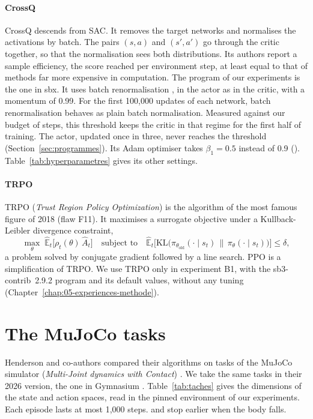 \paragraph{CrossQ}
CrossQ \parencite{bhatt2024crossq} descends from SAC. It removes the target networks and normalises
the activations by batch. The pairs $(s, a)$ and $(s', a')$ go through the critic together, so
that the normalisation sees both distributions. Its authors report a sample efficiency, the score
reached per environment step, at least equal to that of methods far more expensive in computation. The
 program of our experiments is the one in sbx. It uses batch renormalisation
\parencite{ioffe2017batchrenorm}, in the actor as in the critic, with a momentum of 0.99. For the first
100,000 updates of each network, batch renormalisation behaves as plain batch normalisation. Measured
against our budget of steps, this threshold keeps the critic in that regime for the first half of
training. The actor, updated once in three, never reaches the threshold
(Section~\ref{sec:programmes}). Its Adam optimiser takes $\beta_1 = 0.5$ instead of 0.9
(). Table~\ref{tab:hyperparametres} gives its other settings.

\paragraph{TRPO}
TRPO (\emph{Trust Region Policy Optimization}) \parencite{schulman2015trpo} is the algorithm of the most
famous figure of 2018 (flaw F11). It maximises a surrogate objective under a Kullback-Leibler
divergence constraint,
\begin{equation}
  \max_\theta\; \hat{\mathbb{E}}_t\bigl[ \rho_t(\theta)\, \hat{A}_t \bigr]
  \quad \text{subject to} \quad
  \hat{\mathbb{E}}_t\bigl[ \mathrm{KL}\bigl( \pi_{\theta_\text{old}}(\cdot \mid s_t) \,\big\|\, \pi_\theta(\cdot \mid s_t) \bigr) \bigr] \leq \delta,
\end{equation}
a problem solved by conjugate gradient followed by a line search. PPO is a simplification of TRPO. We
use TRPO only in experiment B1, with the sb3-contrib~2.9.2 program and its default values, without any
tuning (Chapter~\ref{chap:05-experiences-methode}).

\section{The MuJoCo tasks}\label{sec:ctx-taches}

Henderson and co-authors compared their algorithms on tasks of the MuJoCo simulator (\emph{Multi-Joint
dynamics with Contact}) \parencite{todorov2012mujoco,henderson2018matters}. We take the same tasks in
their 2026 version, the one in Gymnasium \parencite{towers2024gymnasium}. Table~\ref{tab:taches} gives
the dimensions of the state and action spaces, read in the pinned environment of our experiments. Each
episode lasts at most 1,000 steps.  and  stop earlier when the body
falls.

